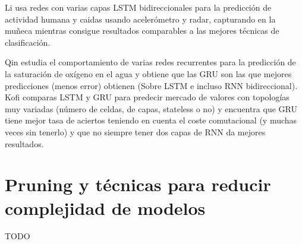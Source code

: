\documentclass[../tfm.tex]{subfiles}
\begin{document}
Li\cite{Li2019} usa redes con varias capas LSTM bidireccionales para la predicción de actividad humana y caidas usando acelerómetro y radar, capturando en la muñeca mientras consigue resultados comparables a las mejores técnicas de clasificación.

Qin\cite{Qin2019} estudia el comportamiento de varias redes recurrentes para la predicción de la saturación de oxígeno en el agua y obtiene que las GRU son las que mejores predicciones (menos error) obtienen (Sobre LSTM e incluso RNN bidireccional). Kofi \cite{Koffi2020} comparas LSTM y GRU para predecir mercado de valores con topologías muy variadas (número de celdas, de capas, stateless o no) y encuentra que GRU tiene mejor tasa de aciertos teniendo en cuenta el coste comutacional (y muchas veces sin tenerlo) y que no siempre tener dos capas de RNN da mejores resultados.


\section{Pruning y técnicas para reducir complejidad de modelos}
TODO
\end{document}
